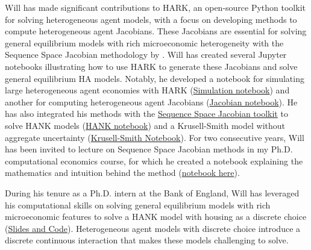 \documentclass[\econtexRoot/Letter]{subfiles}
\begin{document}
Will has made significant contributions to HARK, an open-source Python toolkit for solving heterogeneous agent models, with a focus on developing methods to compute heterogeneous agent Jacobians. These Jacobians are essential for solving general equilibrium models with rich microeconomic heterogeneity with the Sequence Space Jacobian methodology by \cite{Auclert2023}. Will has created several Jupyter notebooks illustrating how to use HARK to generate these Jacobians and solve general equilibrium HA models. Notably, he developed a notebook for simulating large heterogeneous agent economies with HARK (\href{https://github.com/econ-ark/HARK/blob/master/examples/ConsNewKeynesianModel/Transition_Matrix_Example.ipynb}{Simulation notebook}) and another for computing heterogeneous agent Jacobians (\href{https://github.com/econ-ark/HARK/blob/master/examples/ConsNewKeynesianModel/Jacobian_Example.ipynb}{Jacobian notebook}). He has also integrated his methods with the \href{https://github.com/shade-econ/sequence-jacobian}{Sequence Space Jacobian toolkit} to solve HANK models (\href{https://github.com/econ-ark/HARK/blob/master/examples/ConsNewKeynesianModel/SSJ_example.ipynb}{HANK notebook}) and a Krusell-Smith model without aggregate uncertainty (\href{https://github.com/econ-ark/HARK/blob/master/examples/ConsNewKeynesianModel/KS-HARK-presentation.ipynb}{Krusell-Smith Notebook}). For two consecutive years, Will has been invited to lecture on Sequence Space Jacobian methods in my Ph.D. computational economics course, for which he created a notebook explaining the mathematics and intuition behind the method (\href{https://github.com/econ-ark/HARK/blob/master/examples/ConsNewKeynesianModel/SSJ_explanation.ipynb}{notebook here}).

During his tenure as a Ph.D. intern at the Bank of England, Will has leveraged his computational skills on solving general equilibrium models with rich microeconomic features to solve a HANK model with housing as a discrete choice (\href{https://github.com/wdu9/HANK_Housing_Block}{Slides and Code}). Heterogeneous agent models with discrete choice introduce a discrete continuous interaction that makes these models challenging to solve. 
\end{document}
